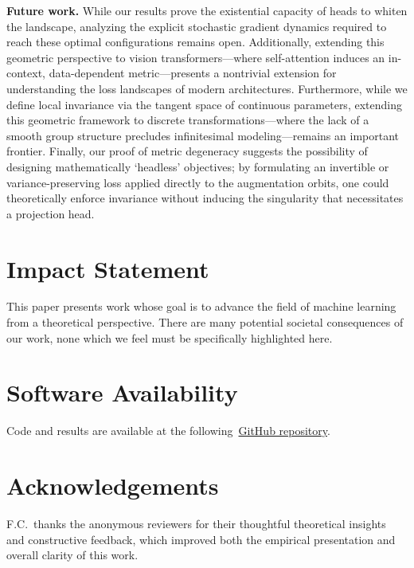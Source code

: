 \documentclass{article}
\theoremstyle{plain}
\theoremstyle{definition}
\theoremstyle{remark}
\begin{document}
\textbf{Future work.} While our results prove the existential capacity of heads to whiten the landscape, analyzing the explicit stochastic gradient dynamics required to reach these optimal configurations remains open. Additionally, extending this geometric perspective to vision transformers---where self-attention induces an in-context, data-dependent metric---presents a nontrivial extension for understanding the loss landscapes of modern architectures. Furthermore, while we define local invariance via the tangent space of continuous parameters, extending this geometric framework to discrete transformations---where the lack of a smooth group structure precludes infinitesimal modeling---remains an important frontier. Finally, our proof of metric degeneracy suggests the possibility of designing mathematically `headless' objectives; by formulating an invertible or variance-preserving loss applied directly to the augmentation orbits, one could theoretically enforce invariance without inducing the singularity that necessitates a projection head.



\clearpage
\section*{Impact Statement}

This paper presents work whose goal is to advance the field of machine learning from a theoretical perspective. There are many potential societal consequences of our work, none which we feel must be specifically highlighted here.

\section*{Software Availability}

Code and results are available at the following~\href{https://github.com/farischaudhry/projection-head-geometry}{GitHub repository}.

\section*{Acknowledgements}

F.C.~thanks the anonymous reviewers for their thoughtful theoretical insights and constructive feedback, which improved both the empirical presentation and overall clarity of this work.
\end{document}
